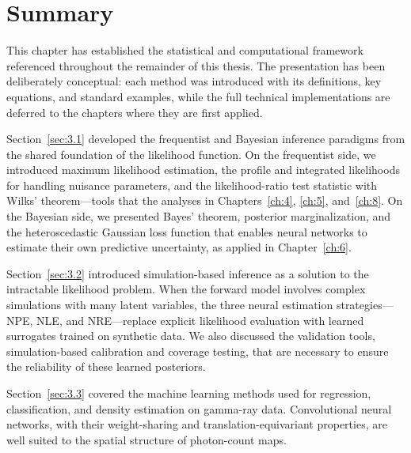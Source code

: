 
\section{Summary}
\label{sec:ch3_summary}
This chapter has established the statistical and computational framework referenced throughout the remainder of this thesis.
The presentation has been deliberately conceptual: each method was introduced with its definitions, key equations, and standard examples, while the full technical implementations are deferred to the chapters where they are first applied.

Section~\ref{sec:3.1} developed the frequentist and Bayesian inference paradigms from the shared foundation of the likelihood function.
On the frequentist side, we introduced maximum likelihood estimation, the profile and integrated likelihoods for handling nuisance parameters, and the likelihood-ratio test statistic with Wilks' theorem---tools that  the analyses in Chapters~\ref{ch:4}, \ref{ch:5}, and~\ref{ch:8}.
On the Bayesian side, we presented Bayes' theorem, posterior marginalization, and the heteroscedastic Gaussian loss function that enables neural networks to estimate their own predictive uncertainty, as applied in Chapter~\ref{ch:6}.

Section~\ref{sec:3.2} introduced simulation-based inference as a solution to the intractable likelihood problem.
When the forward model involves complex simulations with many latent variables, the three neural estimation strategies---NPE, NLE, and NRE---replace explicit likelihood evaluation with learned surrogates trained on synthetic data.
We also discussed the validation tools, simulation-based calibration and coverage testing, that are necessary to ensure the reliability of these learned posteriors.

Section~\ref{sec:3.3} covered the machine learning methods used for regression, classification, and density estimation on gamma-ray data.
Convolutional neural networks, with their weight-sharing and translation-equivariant properties, are well suited to the spatial structure of photon-count maps.

